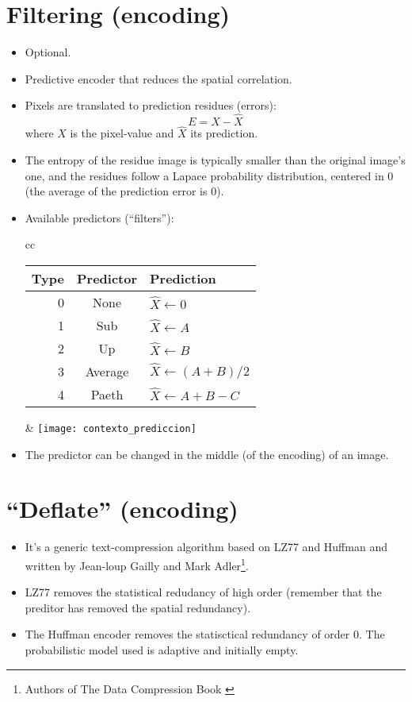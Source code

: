 \section{Filtering (encoding)}
\begin{itemize}
\item Optional.
\item Predictive encoder that reduces the spatial correlation.
\item Pixels are translated to prediction residues (errors):
  \begin{displaymath}
    E = X - \hat{X}
  \end{displaymath}
  where $X$ is the pixel-value and $\hat{X}$ its prediction.
\item The entropy of the residue image is typically smaller than the
  original image's one, and the residues follow a Lapace probability
  distribution, centered in 0 (the average of the prediction error is
  0).
\item Available predictors (``filters''):
  \begin{center}
    \begin{tabular}{cc}
      \begin{tabular}{rcl}
        Type & Predictor & Prediction \\
        \hline
        0 &	None 	& $\hat{X}\leftarrow 0$ \\
        1 &	Sub 	& $\hat{X}\leftarrow A$ \\
        2 &	Up 	& $\hat{X}\leftarrow B$ \\
        3 &	Average & $\hat{X}\leftarrow (A+B)/2$ \\
        4 &	Paeth 	& $\hat{X}\leftarrow A + B - C$
      \end{tabular}
      &
      \texttt{[image: contexto\_prediccion]}
    \end{tabular}
  \end{center}
\item The predictor can be changed in the middle (of the encoding) of
  an image.
\end{itemize}

\section{``Deflate'' (encoding)}
\begin{itemize}
\item It's a generic text-compression algorithm based on LZ77 and
  Huffman and written by Jean-loup Gailly and Mark
  Adler\footnote{Authors of The Data Compression Book
    \cite{Nelson96}}.
\item LZ77 removes the statistical redudancy of high order (remember
  that the preditor has removed the spatial redundancy).
\item The Huffman encoder removes the statisctical redundancy of order
  0. The probabilistic model used is adaptive and initially empty.
\end{itemize}

